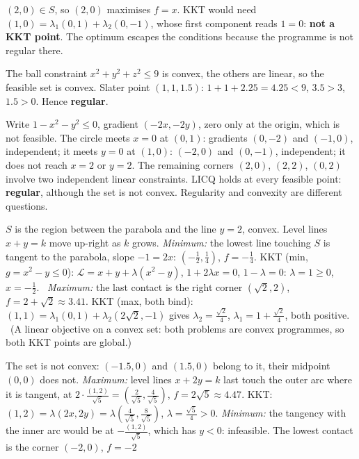 \begin{solutions}
        $(2,0)\in S$, so $(2,0)$ maximises $f=x$. KKT would need
        $(1,0)=\lambda_1(0,1)+\lambda_2(0,-1)$, whose first component reads
        $1=0$: \textbf{not a KKT point}. The optimum escapes the conditions
        because the programme is not regular there.
  \item The ball constraint $x^{2}+y^{2}+z^{2}\le9$ is convex, the others
        are linear, so the feasible set is convex. Slater point
        $(1,1,1.5)$: $1+1+2.25=4.25<9$, $3.5>3$, $1.5>0$. Hence
        \textbf{regular}.
  \item Write $1-x^{2}-y^{2}\le0$, gradient $(-2x,-2y)$, zero only at the
        origin, which is not feasible. The circle meets $x=0$ at $(0,1)$:
        gradients $(0,-2)$ and $(-1,0)$, independent; it meets $y=0$ at
        $(1,0)$: $(-2,0)$ and $(0,-1)$, independent; it does not reach $x=2$
        or $y=2$. The remaining corners $(2,0)$, $(2,2)$, $(0,2)$ involve two
        independent linear constraints. LICQ holds at every feasible point:
        \textbf{regular}, although the set is not convex. Regularity and
        convexity are different questions.
  \item $S$ is the region between the parabola and the line $y=2$, convex.
        Level lines $x+y=k$ move up-right as $k$ grows.
        \emph{Minimum:} the lowest line touching $S$ is tangent to the
        parabola, slope $-1=2x$: $(-\tfrac12,\tfrac14)$, $f=-\tfrac14$. KKT
        (min, $g=x^{2}-y\le0$): $\mathcal{L}=x+y+\lambda(x^{2}-y)$,
        $1+2\lambda x=0$, $1-\lambda=0$: $\lambda=1\ge0$, $x=-\tfrac12$.
        \checkmark\ \emph{Maximum:} the last contact is the right corner
        $(\sqrt2,2)$, $f=2+\sqrt2\approx3.41$. KKT (max, both bind):
        $(1,1)=\lambda_1(0,1)+\lambda_2(2\sqrt2,-1)$ gives
        $\lambda_2=\tfrac{\sqrt2}{4}$, $\lambda_1=1+\tfrac{\sqrt2}4$, both
        positive. \checkmark\ (A linear objective on a convex set: both
        problems are convex programmes, so both KKT points are global.)
  \item The set is not convex: $(-1.5,0)$ and $(1.5,0)$ belong to it, their
        midpoint $(0,0)$ does not. \emph{Maximum:} level lines $x+2y=k$
        last touch the outer arc where it is tangent, at
        $2\cdot\tfrac{(1,2)}{\sqrt5}=(\tfrac2{\sqrt5},\tfrac4{\sqrt5})$,
        $f=2\sqrt5\approx4.47$. KKT: $(1,2)=\lambda(2x,2y)=\lambda(\tfrac4{\sqrt5},\tfrac8{\sqrt5})$,
        $\lambda=\tfrac{\sqrt5}{4}>0$. \emph{Minimum:} the tangency with the
        inner arc would be at $-\tfrac{(1,2)}{\sqrt5}$, which has $y<0$:
        infeasible. The lowest contact is the corner $(-2,0)$, $f=-2$

\end{solutions}
